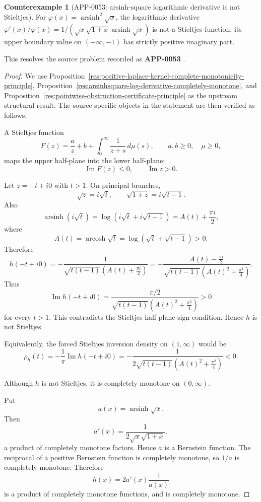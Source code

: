 \documentclass[11pt]{article}
\numberwithin{equation}{section}
\theoremstyle{definition}
\newtheorem{counterexample}[theorem]{Counterexample}
\theoremstyle{remark}
\newcommand{\1}{\mathbf 1}
\begin{document}
\begin{counterexample}[APP-0053: arsinh-square logarithmic derivative is not Stieltjes]
\label{res:not-arsinhsquare-log-derivative-stieltjes}
For \(\varphi(x)=\operatorname{arsinh}^2\sqrt{x}\), the logarithmic derivative \(\varphi'(x)/\varphi(x)=1/(\sqrt{x}\sqrt{1+x}\operatorname{arsinh}\sqrt{x})\) is not a Stieltjes function; its upper boundary value on \((-\infty,-1)\) has strictly positive imaginary part.



This resolves the source problem recorded as \textbf{APP-0053} \cite{app-app-0053-source}.
\end{counterexample}

\begin{proof}
We use Proposition~\ref{res:positive-laplace-kernel-complete-monotonicity-principle}, Proposition~\ref{res:arsinhsquare-log-derivative-completely-monotone}, and Proposition~\ref{res:pointwise-obstruction-certificate-principle} as the upstream structural result. The source-specific objects in the statement are then verified as follows.

A Stieltjes function
\[
F(z)=\frac{a}{z}+b+\int_0^\infty \frac{1}{z+s}\,d\mu(s),
\qquad a,b\ge0,\quad \mu\ge0,
\]
maps the upper half-plane into the lower half-plane:
\[
\operatorname{Im}F(z)\le0,\qquad \operatorname{Im}z>0.
\]

Let \(z=-t+i0\) with \(t>1\). On principal branches,
\[
\sqrt{z}=i\sqrt t,\qquad \sqrt{1+z}=i\sqrt{t-1}.
\]
Also
\[
\operatorname{arsinh}(i\sqrt t)
=\log\left(i\sqrt t+i\sqrt{t-1}\right)
=A(t)+\frac{\pi i}{2},
\]
where
\[
A(t)=\operatorname{arcosh}\sqrt t=\log(\sqrt t+\sqrt{t-1})>0.
\]
Therefore
\[
h(-t+i0)
=-\frac{1}{\sqrt{t(t-1)}\left(A(t)+\frac{\pi i}{2}\right)}
=-\frac{A(t)-\frac{\pi i}{2}}
{\sqrt{t(t-1)}\left(A(t)^2+\frac{\pi^2}{4}\right)}.
\]
Thus
\[
\operatorname{Im}h(-t+i0)
=\frac{\pi/2}
{\sqrt{t(t-1)}\left(A(t)^2+\frac{\pi^2}{4}\right)}>0
\]
for every \(t>1\). This contradicts the Stieltjes half-plane sign condition. Hence \(h\) is not Stieltjes.

Equivalently, the forced Stieltjes inversion density on \((1,\infty)\) would be
\[
\rho_h(t)=-\frac{1}{\pi}\operatorname{Im}h(-t+i0)
=-\frac{1}
{2\sqrt{t(t-1)}\left(A(t)^2+\frac{\pi^2}{4}\right)}<0.
\]

Although \(h\) is not Stieltjes, it is completely monotone on \((0,\infty)\).

Put
\[
a(x)=\operatorname{arsinh}\sqrt{x}.
\]
Then
\[
a'(x)=\frac{1}{2\sqrt{x}\sqrt{1+x}},
\]
a product of completely monotone factors. Hence \(a\) is a Bernstein function. The reciprocal of a positive Bernstein function is completely monotone, so \(1/a\) is completely monotone. Therefore
\[
h(x)=2a'(x)\frac1{a(x)}
\]
is a product of completely monotone functions, and is completely monotone.
\end{proof}
\end{document}
